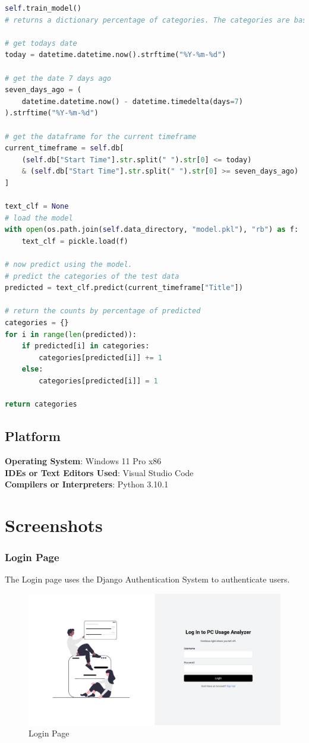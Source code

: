 \documentclass[openany]{report}
\begin{document}
\begin{lstlisting}[language=python, caption=Model Prediction]
self.train_model()
# returns a dictionary percentage of categories. The categories are based on the process names and are tested with the loaded model.

# get todays date
today = datetime.datetime.now().strftime("%Y-%m-%d")

# get the date 7 days ago
seven_days_ago = (
    datetime.datetime.now() - datetime.timedelta(days=7)
).strftime("%Y-%m-%d")

# get the dataframe for the current timeframe
current_timeframe = self.db[
    (self.db["Start Time"].str.split(" ").str[0] <= today)
    & (self.db["Start Time"].str.split(" ").str[0] >= seven_days_ago)
]

text_clf = None
# load the model
with open(os.path.join(self.data_directory, "model.pkl"), "rb") as f:
    text_clf = pickle.load(f)

# now predict using the model.
# predict the categories of the test data
predicted = text_clf.predict(current_timeframe["Title"])

# return the counts by percentage of predicted
categories = {}
for i in range(len(predicted)):
    if predicted[i] in categories:
        categories[predicted[i]] += 1
    else:
        categories[predicted[i]] = 1

return categories
\end{lstlisting}
\section{Platform}
\textbf{Operating System}: Windows 11 Pro x86 \\
\textbf{IDEs or Text Editors Used}: Visual Studio Code\\
\textbf{Compilers or Interpreters}: Python 3.10.1\\

\chapter{Screenshots}
\subsection{Login Page}
The Login page uses the Django Authentication System to authenticate users.\\
\begin{figure}[H]
    \centering
    \includegraphics[width=.95\textwidth]{screenshots/login.jpg}
    \caption{Login Page}
\end{figure}
\end{document}
